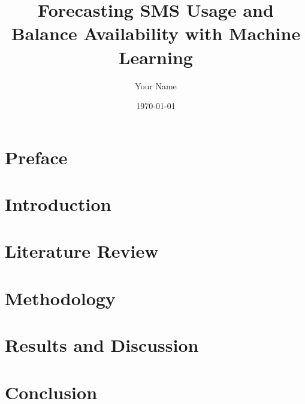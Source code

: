 \documentclass[a4paper,12pt]{book}  %
\title{Forecasting SMS Usage and Balance Availability with Machine Learning}
\author{Your Name}
\date{\today}
\begin{document}
\frontmatter                       %
\maketitle                          %

\chapter*{Preface}                  %
\lipsum[1]                          %

\tableofcontents                    %
\listoffigures                       %
\listoftables                        %

\mainmatter                         %

\chapter{Introduction}              %
\lipsum[1-4]                        %

\chapter{Literature Review}         %
\lipsum[1-3]                        %

\chapter{Methodology}               %
\lipsum[2]                          %

\chapter{Results and Discussion}    %
\lipsum[3]                          %

\chapter{Conclusion}                %
\lipsum[1]                          %

\end{document}
